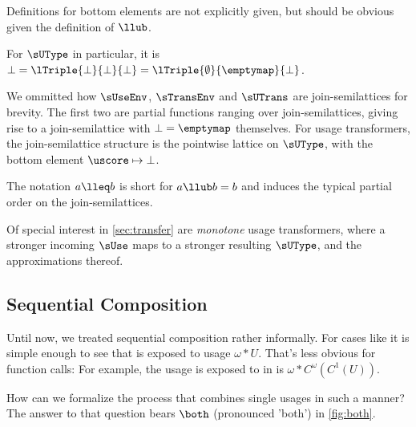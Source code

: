 Definitions for bottom elements are not explicitly given, but should be obvious given the definition of $\llub$.

For $\sUType$ in particular, it is $\bot = \lTriple{\bot}{\bot}{\bot} = \lTriple{\emptyset}{\emptymap}{\bot}$.

We ommitted how $\sUseEnv$, $\sTransEnv$ and $\sUTrans$ are join-semilattices for brevity. 
The first two are partial functions ranging over join-semilattices, giving rise to a join-semilattice with $\bot = \emptymap$ themselves. 
For usage transformers, the join-semilattice structure is the pointwise lattice on $\sUType$, with the bottom element $\uscore \mapsto \bot$. 

The notation $a \lleq b$ is short for $a \llub b = b$ and induces the typical partial order on the join-semilattices.

Of special interest in \cref{sec:transfer} are \emph{monotone} usage transformers, \eg where a stronger incoming $\sUse$ maps to a stronger resulting $\sUType$, and the approximations thereof.

\subsection{Sequential Composition}\label{sec:both}

Until now, we treated sequential composition rather informally. 
For cases like  it is simple enough to see that  is exposed to usage $\omega*U$. 
That's less obvious for function calls: For example, the usage  is exposed to in  is $\omega*C^\omega(C^1(U))$.

How can we formalize the process that combines single usages in such a manner?
The answer to that question bears $\both$ (pronounced 'both') in \cref{fig:both}.

